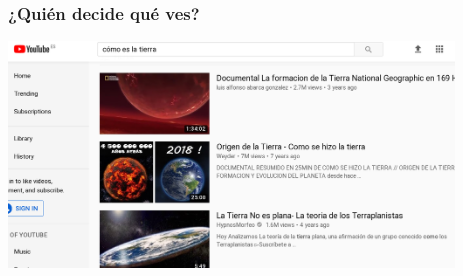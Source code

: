 \documentclass[17pt,aspectratio=169]{beamer}
\begin{document}










\begin{frame}
\frametitle{¿Quién decide qué ves?}

\begin{center}
\includegraphics[height=6cm]{figs/como-es-la-tierra}
\end{center}

\end{frame}
\end{document}
